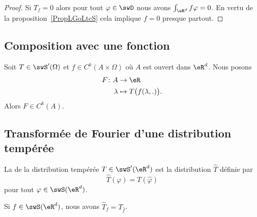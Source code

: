 \begin{proof}
	Si \( T_f=0\) alors pour tout \( \varphi\in \swD\) nous avons \( \int_{\eR^d}f\varphi=0\). En vertu de la proposition~\ref{PropLGoLtcS} cela implique \( f=0\) presque partout.
\end{proof}

\subsection{Composition avec une fonction}

\begin{proposition} \label{PropBQUOcyw}
	Soit \( T\in\swS'(\Omega)\) et \( f\in C^k(A\times \Omega)\) où \( A\) est ouvert dans \( \eR^d\). Nous posons
	\begin{equation}
		\begin{aligned}
			F\colon A & \to \eR                            \\
			\lambda   & \mapsto T\big( f(\lambda,.) \big).
		\end{aligned}
	\end{equation}
	Alors \( F\in C^k(A)\).
\end{proposition}

\subsection{Transformée de Fourier d'une distribution tempérée}

\begin{definition}
	La  de la distribution tempérée \( T\in\swS'(\eR^d)\) est la distribution \( \hat T\) définie par
	\begin{equation}
		\hat T(\varphi)=T(\hat \varphi)
	\end{equation}
	pour tout \( \varphi\in\swS(\eR^d)\).
\end{definition}

\begin{lemma}
	Si \( f\in \swS(\eR^d)\), nous avons \( \hat T_f=T_{\hat f}\).
\end{lemma}

